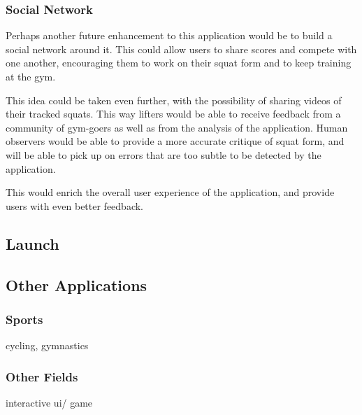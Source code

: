 \subsubsection{Social Network}

Perhaps another future enhancement to this application would be to build a social network around it. This could allow users to share scores and compete with one another, encouraging them to work on their squat form and to keep training at the gym.

This idea could be taken even further, with the possibility of sharing videos of their tracked squats. This way lifters would be able to receive feedback from a community of gym-goers as well as from the analysis of the application. Human observers would be able to provide a more accurate critique of squat form, and will be able to pick up on errors that are too subtle to be detected by the application.

This would enrich the overall user experience of the application, and provide users with even better feedback.

\subsection{Launch}

\subsection{Other Applications}

\subsubsection{Sports}

cycling, gymnastics

\subsubsection{Other Fields}

interactive ui/ game